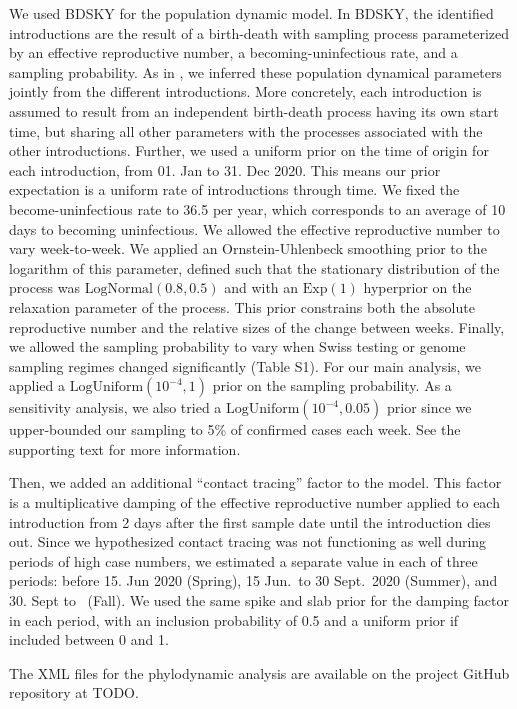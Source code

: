 \documentclass[9pt,twoside,lineno]{pnas-new} %
\begin{document}
We used BDSKY for the population dynamic model. In BDSKY, the identified introductions are the result of a birth-death with sampling process parameterized by an effective reproductive number, a becoming-uninfectious rate, and a sampling probability. As in \cite{Muller2020}, we inferred these population dynamical parameters jointly from the different introductions. More concretely, each introduction is assumed to result from an independent birth-death process having its own start time, but sharing all other parameters with the processes associated with the other introductions. 
Further, we used a uniform prior on the time of origin for each introduction, from 01. Jan to 31. Dec 2020. This means our prior expectation is a uniform rate of introductions through time. We fixed the become-uninfectious rate to 36.5 per year, which corresponds to an average of 10 days to becoming uninfectious. We allowed the effective reproductive number to vary week-to-week. We applied an Ornstein-Uhlenbeck smoothing prior to the logarithm of this parameter, defined such that the stationary distribution of the process was $\text{LogNormal}(0.8, 0.5)$  and with an $\text{Exp}(1)$ hyperprior on the relaxation parameter of the process. This prior constrains both the absolute reproductive number and the relative sizes of the change between weeks. Finally, we allowed the sampling probability to vary when Swiss testing or genome sampling regimes changed significantly (Table S1). For our main analysis, we applied a $\text{LogUniform}(10^{-4}, 1)$ prior on the sampling probability. As a sensitivity analysis, we also tried a $\text{LogUniform}(10^{-4}, 0.05)$ prior since we upper-bounded our sampling to 5\% of confirmed cases each week. See the supporting text for more information.

Then, we added an additional ``contact tracing'' factor to the model. This factor is a multiplicative damping of the effective reproductive number applied to each introduction from 2 days after the first sample date until the introduction dies out. Since we hypothesized contact tracing was not functioning as well during periods of high case numbers, we estimated a separate value in each of three periods: before 15. Jun 2020 (Spring), 15 Jun.~to 30 Sept.~2020 (Summer), and 30. Sept to \maxdate\ (Fall). We used the same spike and slab prior for the damping factor in each period, with an inclusion probability of 0.5 and a uniform prior if included between 0 and 1. 

The XML files for the phylodynamic analysis are available on the project GitHub repository at TODO.
\end{document}

